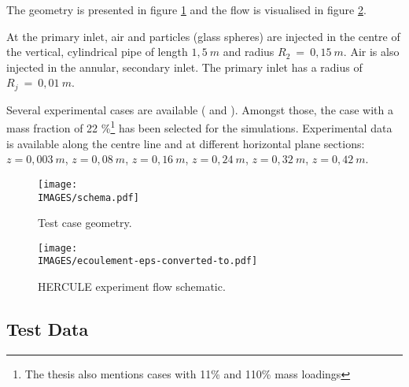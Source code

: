 The geometry is presented in figure \ref{schema} and the flow is visualised in figure \ref{ecoulement}.

\noindent
At the primary inlet, air and particles (glass spheres) are injected in the centre of the vertical, cylindrical pipe of length $1,5~m$ and radius $R_2~=~0,15~m$. Air is also injected in the annular, secondary inlet. The primary inlet has a radius of $R_j~=~0,01~m$.

\noindent
Several experimental cases are available (\cite{Rap3} and
\cite{TheseNC}). Amongst those, the case with a mass fraction of 22 \%\footnote{The thesis \cite{TheseNC} also mentions cases with 11\% and 110\% mass loadings} has been selected for the simulations. Experimental data is available along the centre line and at different horizontal plane sections: $z = 0,003~m$,
$z = 0,08~m$, $z = 0,16~m$, $z = 0,24~m$, $z = 0,32~m$, $z = 0,42~m$.


\begin{figure}[H]
   \centerline{\texttt{[image: \\IMAGES/schema.pdf]}}
   \caption{Test case geometry.}
   \label{schema}
\end{figure}

\begin{figure}[H]
   \centerline{\texttt{[image: \\IMAGES/ecoulement-eps-converted-to.pdf]}}
   \caption{HERCULE experiment flow schematic.}
   \label{ecoulement}
\end{figure}

\clearpage

\subsection{Test Data}

